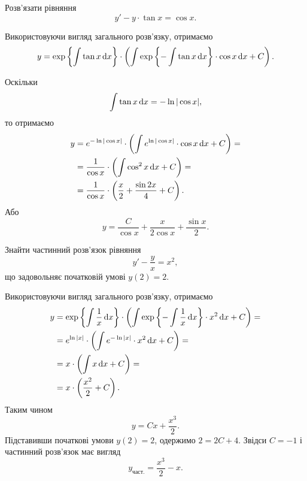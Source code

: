 \begin{example}
	Розв’язати рівняння \[ y' - y \cdot \tan x = \cos x.\]
\end{example}
\begin{solution}
	Використовуючи вигляд загального розв’язку, отримаємо
	\[ y = \exp\left\{\int \tan x \mathop{}\!\mathrm{d} x\right\} \cdot \left(\int \exp\left\{-\int\tan x\mathop{}\!\mathrm{d} x\right\}\cdot \cos x \mathop{}\!\mathrm{d} x+C\right). \]

	Оскільки \[\int \tan x \mathop{}\!\mathrm{d} x = - \ln |\cos x|,\] то отримаємо
	\begin{align*}
		y &= e^{-\ln|\cos x|} \cdot \left(\int e^{\ln|\cos x|} \cdot \cos x \mathop{}\!\mathrm{d} x+C\right) = \\
		&= \frac{1}{\cos x} \cdot \left( \int \cos^2 x \mathop{}\!\mathrm{d} x + C \right) = \\
		&= \frac{1}{\cos x} \cdot \left( \frac x2 + \frac{\sin 2x}{4} + C \right).
	\end{align*}
	Або
	\[ y = \frac{C}{\cos x} + \frac{x}{2 \cos x} + \frac{\sin x}{2}. \]
\end{solution}

\begin{example}
	Знайти частинний розв’язок рівняння \[ y' - \frac yx = x^2,\] що задовольняє початковій умові $y(2) = 2$.
\end{example}
\begin{solution}
	Використовуючи вигляд загального розв’язку, отримаємо
	\begin{align*}
		y &= \exp\left\{\int \frac1x \mathop{}\!\mathrm{d} x\right\} \cdot \left(\int \exp\left\{-\int\frac1x\mathop{}\!\mathrm{d} x\right\}\cdot x^2 \mathop{}\!\mathrm{d} x+C\right) = \\
		&= e^{\ln|x|} \cdot \left(\int e^{-\ln|x|} \cdot x^2 \mathop{}\!\mathrm{d} x+C\right) = \\
		&= x \cdot \left(\int x \mathop{}\!\mathrm{d} x+C\right) = \\
		&= x \cdot \left(\frac{x^2}{2} + C\right).
	\end{align*}
	Таким чином 
	\[ y = C x + \frac{x^3}{2}.\]
	Підставивши початкові умови $y(2) = 2$, одержимо $2 = 2C + 4$. Звідси $C = -1$ і частинний розв’язок має вигляд \[ y_{\text{част.}} = \frac{x^3}{2} - x.\]
\end{solution}

